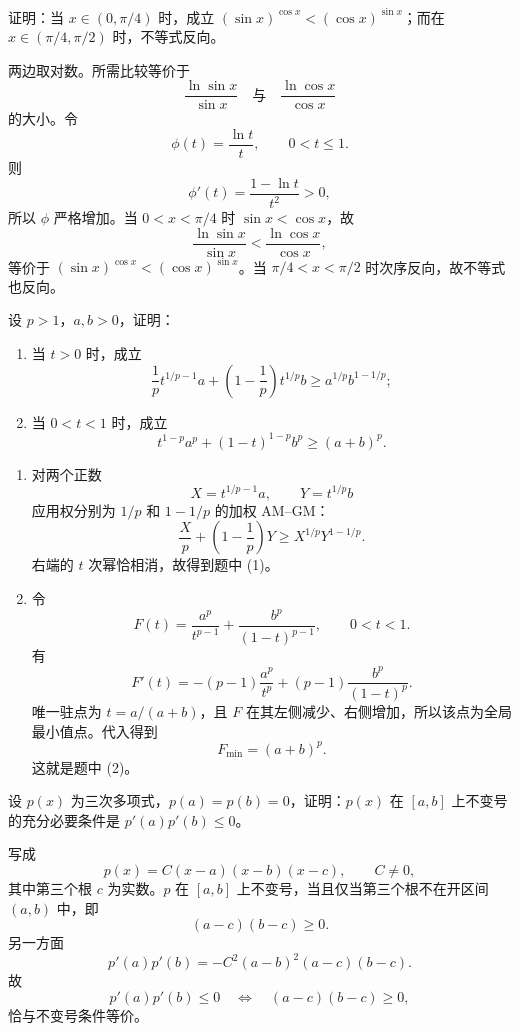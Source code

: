\begin{xreferenceproblem}[12]
证明：当 $x\in(0,\pi/4)$ 时，成立 $(\sin x)^{\cos x}<(\cos x)^{\sin x}$；而在 $x\in(\pi/4,\pi/2)$ 时，不等式反向。
\end{xreferenceproblem}
\begin{xsolution}
两边取对数。所需比较等价于
\[
  \frac{\ln\sin x}{\sin x}
  \quad\text{与}\quad
  \frac{\ln\cos x}{\cos x}
\]
的大小。令
\[
  \phi(t)=\frac{\ln t}{t},\qquad0<t\le1.
\]
则
\[
  \phi'(t)=\frac{1-\ln t}{t^2}>0,
\]
所以 $\phi$ 严格增加。当 $0<x<\pi/4$ 时 $\sin x<\cos x$，故
\[
  \frac{\ln\sin x}{\sin x}<\frac{\ln\cos x}{\cos x},
\]
等价于 $(\sin x)^{\cos x}<(\cos x)^{\sin x}$。当 $\pi/4<x<\pi/2$ 时次序反向，故不等式也反向。
\end{xsolution}


\begin{xreferenceproblem}[13]
设 $p>1$，$a,b>0$，证明：
  \begin{enumerate}[label=(\arabic*)]
    \item 当 $t>0$ 时，成立
    \[
      \frac1p t^{1/p-1}a+\left(1-\frac1p\right)t^{1/p}b
      \ge a^{1/p}b^{1-1/p};
    \]
    \item 当 $0<t<1$ 时，成立
    \[
      t^{1-p}a^p+(1-t)^{1-p}b^p\ge(a+b)^p.
    \]
  \end{enumerate}
\end{xreferenceproblem}
\begin{xsolution}
\begin{enumerate}[label=(\arabic*)]
  \item 对两个正数
  \[
    X=t^{1/p-1}a,
    \qquad Y=t^{1/p}b
  \]
  应用权分别为 $1/p$ 和 $1-1/p$ 的加权 AM--GM：
  \[
    \frac Xp+\left(1-\frac1p\right)Y
    \ge X^{1/p}Y^{1-1/p}.
  \]
  右端的 $t$ 次幂恰相消，故得到题中 (1)。

  \item 令
  \[
    F(t)=\frac{a^p}{t^{p-1}}+
          \frac{b^p}{(1-t)^{p-1}},\qquad0<t<1.
  \]
  有
  \[
    F'(t)=-(p-1)\frac{a^p}{t^p}
    +(p-1)\frac{b^p}{(1-t)^p}.
  \]
  唯一驻点为 $t=a/(a+b)$，且 $F$ 在其左侧减少、右侧增加，所以该点为全局最小值点。代入得到
  \[
    F_{\min}=(a+b)^p.
  \]
  这就是题中 (2)。
\end{enumerate}
\end{xsolution}


\begin{xreferenceproblem}[14]
设 $p(x)$ 为三次多项式，$p(a)=p(b)=0$，证明：$p(x)$ 在 $[a,b]$ 上不变号的充分必要条件是 $p'(a)p'(b)\le0$。
\end{xreferenceproblem}
\begin{xsolution}
写成
\[
  p(x)=C(x-a)(x-b)(x-c),\qquad C\ne0,
\]
其中第三个根 $c$ 为实数。$p$ 在 $[a,b]$ 上不变号，当且仅当第三个根不在开区间 $(a,b)$ 中，即
\[
  (a-c)(b-c)\ge0.
\]
另一方面
\[
  p'(a)p'(b)
  =-C^2(a-b)^2(a-c)(b-c).
\]
故
\[
  p'(a)p'(b)\le0
  \quad\Longleftrightarrow\quad
  (a-c)(b-c)\ge0,
\]
恰与不变号条件等价。
\end{xsolution}


